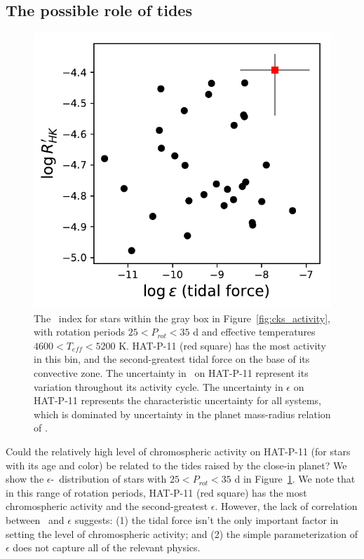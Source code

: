 \subsection{The possible role of tides}

\begin{figure}
\begin{center}
\includegraphics[scale=1]{sindex/tides_rhk.pdf}
\caption{The \rprime\ index for stars within the gray box in Figure~\ref{fig:cks_activity}, with rotation periods $25 < P_{rot} < 35$ d and effective temperatures $4600 < T_{eff} < 5200$ K. HAT-P-11 (red square) has the most activity in this bin, and the second-greatest tidal force on the base of its convective zone. The uncertainty in \rprime\ on HAT-P-11 represent its variation throughout its activity cycle. The uncertainty in $\epsilon$ on HAT-P-11 represents the characteristic uncertainty for all systems, which is dominated by uncertainty in the planet mass-radius relation of \citet{Chen2017}.}
\label{fig:rhk_eps}
\end{center}
\end{figure}

Could the relatively high level of chromospheric activity on HAT-P-11 (for stars with its age and color) be related to the tides raised by the close-in planet? We show the $\epsilon$-\rprime\ distribution of stars with $25 < P_{rot} < 35$ d in Figure~\ref{fig:rhk_eps}. We note that in this range of rotation periods, HAT-P-11 (red square) has the most chromospheric activity and the second-greatest $\epsilon$. However, the lack of  correlation between \rprime\ and $\epsilon$ suggests: (1) the tidal force isn't the only important factor in setting the level of chromospheric activity; and (2) the simple parameterization of $\epsilon$ does not capture all of the relevant physics. 

